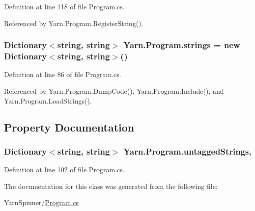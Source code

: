 Definition at line 118 of file Program.\-cs.



Referenced by Yarn.\-Program.\-Register\-String().

\hypertarget{a00146_a59263e00cecfe36d9881b4c30b048f09}{
\subsubsection[{strings}]{\setlength{\rightskip}{0pt plus 5cm}Dictionary$<$string, string$>$ Yarn.\-Program.\-strings = new Dictionary$<$string, string$>$()\hspace{0.3cm}{\ttfamily [package]}}}\label{a00146_a59263e00cecfe36d9881b4c30b048f09}


Definition at line 86 of file Program.\-cs.



Referenced by Yarn.\-Program.\-Dump\-Code(), Yarn.\-Program.\-Include(), and Yarn.\-Program.\-Load\-Strings().



\subsection{Property Documentation}
\hypertarget{a00146_aa8fedbfceaf931d1da3f600eaab6ae87}{
\subsubsection[{untagged\-Strings}]{\setlength{\rightskip}{0pt plus 5cm}Dictionary$<$string, string$>$ Yarn.\-Program.\-untagged\-Strings\hspace{0.3cm}{\ttfamily [get]}, {\ttfamily [package]}}}\label{a00146_aa8fedbfceaf931d1da3f600eaab6ae87}


Definition at line 102 of file Program.\-cs.



The documentation for this class was generated from the following file\-:\begin{DoxyCompactItemize}
\item 
Yarn\-Spinner/\hyperlink{a00302}{Program.\-cs}\end{DoxyCompactItemize}

